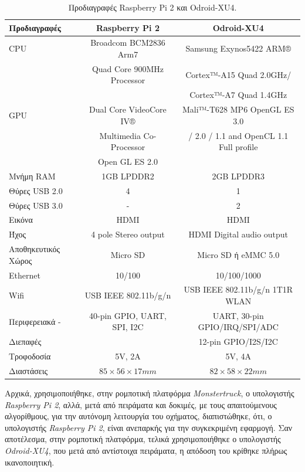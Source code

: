 \bigskip
\begin{table}[!ht]
	\centering
	\caption{Προδιαγραφές Raspberry Pi 2 και Odroid-XU4.}
	\begin{tabular}{| l | c | c |}
   		\hline
	   \textbf{Προδιαγραφές} & \textbf{Raspberry Pi 2} & \textbf{Odroid-XU4} \\ \hline
	   	CPU & Broadcom BCM2836 Arm7 & Samsung Exynos5422 ARM® \\ &Quad Core 900MHz Processor & Cortex™-A15 Quad 2.0GHz/\\ & & Cortex™-A7 Quad 1.4GHz\\ \hline
		GPU & Dual Core VideoCore IV® & Mali™-T628 MP6 OpenGL ES 3.0\\
		& Multimedia Co-Processor & / 2.0 / 1.1 and OpenCL 1.1 Full profile\\ 
		&  Open GL ES 2.0 &\\ \hline		   
	   Μνήμη RAM & 1GB LPDDR2 & 2GB LPDDR3 \\ \hline
	   Θύρες USB 2.0 & 4 & 1\\ \hline
	   Θύρες USB 3.0 & - & 2\\ \hline
	   Εικόνα & HDMI & HDMI\\ \hline
	   Ήχος & 4 pole Stereo output & HDMI Digital audio output\\ \hline
	   Αποθηκευτικός Χώρος & Micro SD & Micro SD ή eMMC 5.0\\ \hline
	   Ethernet & 10/100 & 10/100/1000\\ \hline
	  	Wifi & USB IEEE 802.11b/g/n & USB IEEE 802.11b/g/n 1T1R WLAN\\ \hline
	  	Περιφερειακά - & 40-pin GPIO, UART, SPI, I2C & UART, 30-pin GPIO/IRQ/SPI/ADC\\
	  	Διεπαφές & & 12-pin GPIO/I2S/I2C \\ \hline
	  	Τροφοδοσία & 5V, 2A & 5V, 4A\\ \hline
	   Διαστάσεις & $85 \times 56 \times 17 mm$ & $82 \times 58 \times 22 mm$\\\hline
   \end{tabular}
	\label{tab:computer_specs}
\end{table}

\newpage
Αρχικά, χρησιμοποιήθηκε, στην ρομποτική πλατφόρμα \textit{Monstertruck}, ο υπολογιστής \textit{Raspberry Pi 2}, αλλά, μετά από πειράματα και δοκιμές, με τους απαιτούμενους αλγορίθμους, για την αυτόνομη λειτουργία του οχήματος, διαπιστώθηκε, ότι, ο υπολογιστής \textit{Raspberry Pi 2},  είναι ανεπαρκής για την συγκεκριμένη εφαρμογή. Σαν αποτέλεσμα, στην ρομποτική πλατφόρμα, τελικά χρησιμοποιήθηκε ο υπολογιστής \textit{Odroid-XU4}, που μετά από αντίστοιχα πειράματα, η απόδοση του κρίθηκε πλήρως ικανοποιητική.

